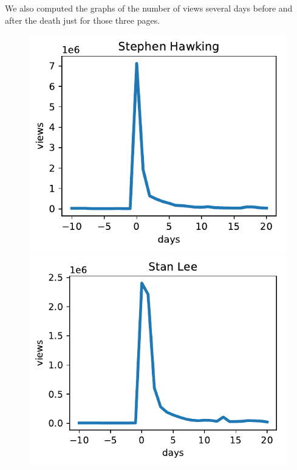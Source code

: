 \documentclass[conference]{IEEEtran}
\begin{document}
\medskip

We also computed the graphs of the number of views several days before and after the death just for those three pages. 

\begin{figure}[!htb] \label{views}
  \includegraphics[width=\linewidth]{viewsSH.pdf}
\endminipage\hfill
{}
  \includegraphics[width=\linewidth]{viewsSL.pdf}
\endminipage\hfill
{}%

\end{figure}
\end{document}
